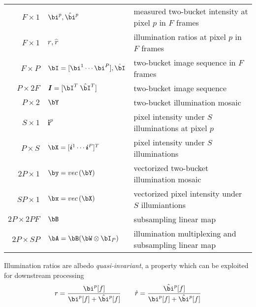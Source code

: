 \documentclass[11pt]{article}
\renewcommand{\vec}[1]{vec\left(#1\right)}
\renewcommand{\si}{\boldsymbol{i}}
\renewcommand{\sI}{\boldsymbol{I}}
\begin{document}
\begin{table}[!htbp]
\begin{center}
\begin{tabular}{rll}
        $F \times 1$         & $\bi^p,\hat{\bi}^p$                     & measured two-bucket intensity at pixel $p$ in $F$ frames \\
        $F \times 1$         & $r,\hat{r}$                             & illumination ratios at pixel $p$ in $F$ frames \\
        $F\times P$          & $\bI = [\bi^1 \cdots \bi^P],\hat{\bI}$  & two-bucket image sequence in $F$ frames \\ 
        $P\times 2F$         & $\sI = [\bI^T \;\hat{\bI}^T]$           & two-bucket image sequence \\
        $P\times 2$          & $\bY$                                   & two-bucket illumination mosaic \\
        $S\times 1$          & $\si^p$                                 & pixel intensity under $S$ illuminations at pixel $p$ \\
        $P\times S$          & $\bX = [\si^1 \cdots \si^P]^T$          & pixel intensity under $S$ illuminations \\    
        $2P\times 1$         & $\by = \vec{\bY}$                       & vectorized two-bucket illumination mosaic \\
        $SP\times 1$         & $\bx = \vec{\bX}$                       & vectorized pixel intensity under $S$ illumiantions \\
        $2P\times 2PF$       & $\bB$                                   & subsampling linear map \\
        $2P\times SP$        & $\bA = \bB(\bW\otimes \bI_P)$           & illumination multiplexing and subsampling linear map \\
    \end{tabular}
    \end{center}
\end{table}
\noindent Illumination ratios are albedo \textit{quasi-invariant}, a property which can be exploited for downstream processing
\[
    r = \frac{\bi^p[f]}{\bi^p[f] + \hat{\bi}^p[f]} 
    \quad\quad
    \hat{r} =   \frac{\hat{\bi}^p[f]}{\bi^p[f] + \hat{\bi}^p[f]} 
\]
\end{document}
